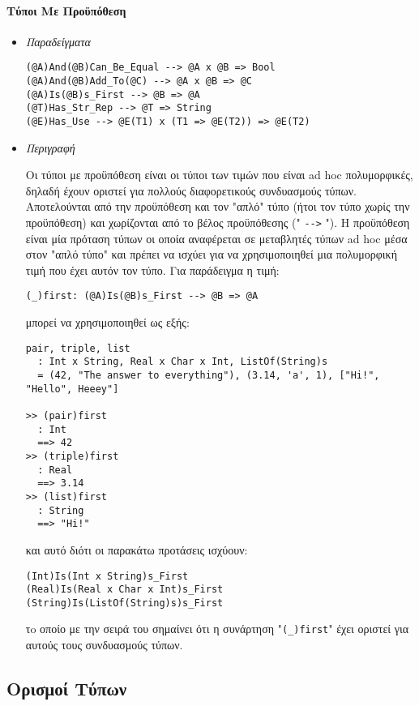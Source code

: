 \documentclass[diploma]{softlab-thesis}
\begin{document}
\newpage

\paragraph{Τύποι Με Προϋπόθεση}

\begin{itemize}
\item \textit{Παραδείγματα}
\begin{verbatim}
(@A)And(@B)Can_Be_Equal --> @A x @B => Bool
(@A)And(@B)Add_To(@C) --> @A x @B => @C
(@A)Is(@B)s_First --> @B => @A
(@T)Has_Str_Rep --> @T => String
(@E)Has_Use --> @E(T1) x (T1 => @E(T2)) => @E(T2)
\end{verbatim}

\item \textit{Περιγραφή}

Οι τύποι με προϋπόθεση είναι οι τύποι των τιμών που είναι ad hoc πολυμορφικές,
δηλαδή έχουν οριστεί για πολλούς διαφορετικούς συνδυασμούς τύπων. Αποτελούνται
από την προϋπόθεση και τον "απλό" τύπο (ήτοι τον τύπο χωρίς την προϋπόθεση)
και χωρίζονται από το βέλος προϋπόθεσης (" \verb|-->| "). Η προϋπόθεση είναι
μία πρόταση τύπων οι οποία αναφέρεται σε μεταβλητές τύπων ad hoc μέσα
στον "απλό τύπο" και πρέπει να ισχύει για να χρησιμοποιηθεί μια πολυμορφική
τιμή που έχει αυτόν τον τύπο. Για παράδειγμα η τιμή:
\begin{verbatim}
(_)first: (@A)Is(@B)s_First --> @B => @A
\end{verbatim}
μπορεί να χρησιμοποιηθεί ως εξής:
\begin{verbatim}
pair, triple, list
  : Int x String, Real x Char x Int, ListOf(String)s
  = (42, "The answer to everything"), (3.14, 'a', 1), ["Hi!", "Hello", Heeey"]

>> (pair)first
  : Int
  ==> 42
>> (triple)first
  : Real
  ==> 3.14
>> (list)first
  : String
  ==> "Hi!"
\end{verbatim}
και αυτό διότι οι παρακάτω προτάσεις ισχύουν:
\begin{verbatim}
(Int)Is(Int x String)s_First
(Real)Is(Real x Char x Int)s_First
(String)Is(ListOf(String)s)s_First
\end{verbatim}
τo οποίο με την σειρά του σημαίνει ότι η συνάρτηση "\verb|(_)first|" έχει
οριστεί για αυτούς τους συνδυασμούς τύπων.

\end{itemize}

\newpage

\subsection{Ορισμοί Τύπων}
\end{document}
